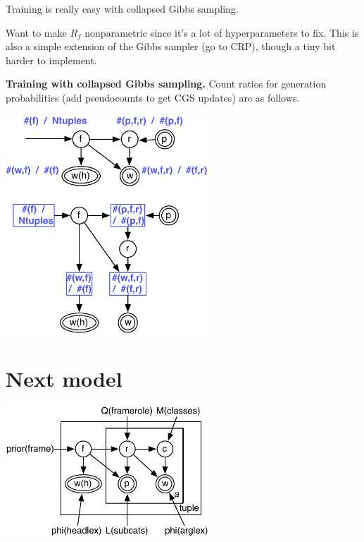 \documentclass[11pt,letterpaper]{article}
\begin{document}
Training is really easy with collapsed Gibbs sampling.

Want to make $R_f$ nonparametric since it's a lot of hyperparameters to fix.
This is also a simple extension of the Gibbs sampler (go to CRP), though a tiny bit
harder to implement.

\textbf{Training with collapsed Gibbs sampling.}
Count ratios for generation probabilities (add pseudocounts to get CGS updates) are as follows.

\includegraphics[width=3in]{cgs_ratios.pdf}


\section{Next model}

\includegraphics[width=3in]{diagram2}

% 
% 
\end{document}
